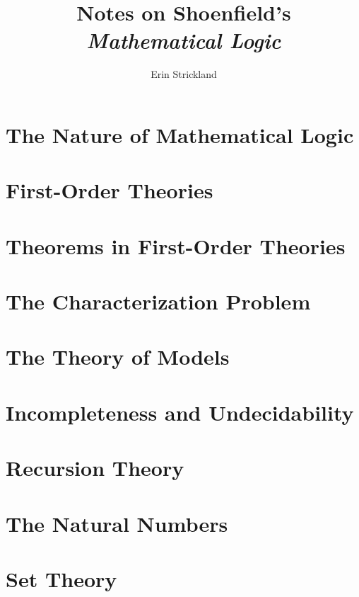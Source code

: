 \documentclass[10pt,leqno]{article}
\author{{Erin Strickland} \\
    \eddress{strickland.g.erin@gmail.com}}
\title{{\vspace*{-1.5in}}Notes on Shoenfield's \\
    \emph{Mathematical Logic}}
\date{\vspace{-2ex}}
\theoremstyle{theorem}
\theoremstyle{example}
\theoremstyle{exercise}
\numberwithin{equation}{subsection}
\begin{document}
\maketitle

\tableofcontents

\section{The Nature of Mathematical Logic}


\section{First-Order Theories}


\section{Theorems in First-Order Theories}


\section{The Characterization Problem}


\section{The Theory of Models}


\section{Incompleteness and Undecidability}


\section{Recursion Theory}


\section{The Natural Numbers}


\section{Set Theory}


\appendix

\end{document}
